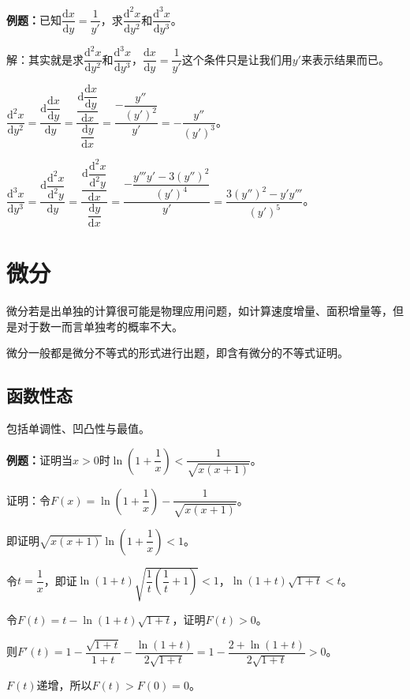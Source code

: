 \documentclass[UTF8, 12pt]{ctexart}
\begin{document}
\textbf{例题：}已知$\dfrac{\textrm{d}x}{\textrm{d}y}=\dfrac{1}{y'}$，求$\dfrac{\textrm{d}^2x}{\textrm{d}y^2}$和$\dfrac{\textrm{d}^3x}{\textrm{d}y^3}$。

解：其实就是求$\dfrac{\textrm{d}^2x}{\textrm{d}y^2}$和$\dfrac{\textrm{d}^3x}{\textrm{d}y^3}$，$\dfrac{\textrm{d}x}{\textrm{d}y}=\dfrac{1}{y'}$这个条件只是让我们用$y'$来表示结果而已。

$\dfrac{\textrm{d}^2x}{\textrm{d}y^2}=\dfrac{\textrm{d}\dfrac{\textrm{d}x}{\textrm{d}y}}{\textrm{d}y}=\dfrac{\dfrac{\textrm{d}\dfrac{\textrm{d}x}{\textrm{d}y}}{\textrm{d}x}}{\dfrac{\textrm{d}y}{\textrm{d}x}}=\dfrac{-\dfrac{y''}{(y')^2}}{y'}=-\dfrac{y''}{(y')^3}$。\medskip

$\dfrac{\textrm{d}^3x}{\textrm{d}y^3}=\dfrac{\textrm{d}\dfrac{\textrm{d}^2x}{\textrm{d}^2y}}{\textrm{d}y}=\dfrac{\dfrac{\textrm{d}\dfrac{\textrm{d}^2x}{\textrm{d}^2y}}{\textrm{d}x}}{\dfrac{\textrm{d}y}{\textrm{d}x}}=\dfrac{-\dfrac{y'''y'-3(y'')^2}{(y')^4}}{y'}=\dfrac{3(y'')^2-y'y'''}{(y')^5}$。

\section{微分}

微分若是出单独的计算很可能是物理应用问题，如计算速度增量、面积增量等，但是对于数一而言单独考的概率不大。

微分一般都是微分不等式的形式进行出题，即含有微分的不等式证明。

\subsection{函数性态}

包括单调性、凹凸性与最值。

\textbf{例题：}证明当$x>0$时$\ln\left(1+\dfrac{1}{x}\right)<\dfrac{1}{\sqrt{x(x+1)}}$。

证明：令$F(x)=\ln\left(1+\dfrac{1}{x}\right)-\dfrac{1}{\sqrt{x(x+1)}}$。

即证明$\sqrt{x(x+1)}\ln\left(1+\dfrac{1}{x}\right)<1$。

令$t=\dfrac{1}{x}$，即证$\ln(1+t)\sqrt{\dfrac{1}{t}\left(\dfrac{1}{t}+1\right)}<1$，$\ln(1+t)\sqrt{1+t}<t$。

令$F(t)=t-\ln(1+t)\sqrt{1+t}$，证明$F(t)>0$。\medskip

则$F'(t)=1-\dfrac{\sqrt{1+t}}{1+t}-\dfrac{\ln(1+t)}{2\sqrt{1+t}}=1-\dfrac{2+\ln(1+t)}{2\sqrt{1+t}}>0$。

$F(t)$递增，所以$F(t)>F(0)=0$。
\end{document}
